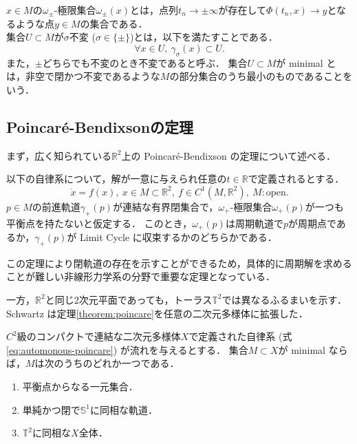\documentclass[../main]{subfiles}
\begin{document}
$x\in M$の$\omega_\pm$-極限集合$\omega_\pm(x)$とは，点列$t_n\to \pm\infty$が存在して$\Phi(t_n,x)\to y$となるような点$y\in M$の集合である．\\

集合$U\subset M$が$\sigma$不変 ($\sigma\in\{\pm\}$)とは，以下を満たすことである．
\begin{equation}
    \forall x\in U,\ \gamma_\sigma (x)\subset U.
\end{equation}
また，$\pm$どちらでも不変のとき不変であると呼ぶ．
集合$U\subset M$が minimal とは，非空で閉かつ不変であるような$M$の部分集合のうち最小のものであることをいう．
\subsection{Poincar\'{e}-Bendixsonの定理}
まず，広く知られている$\mathbb{R}^2$上の Poincar\'{e}-Bendixson の定理について述べる．
\begin{screen}
    \begin{theorem}
        以下の自律系について，解が一意に与えられ任意の$t\in\mathbb{R}$で定義されるとする．
        \begin{equation}
            \dot{x}=f(x),\ x\in M\subset \mathbb{R}^2,\ f\in C^1(M,\mathbb{R}^2),\ M:\mathrm{open}.         \label{eq:automonous-poincare}
        \end{equation}
        $p\in M$の前進軌道$\gamma_+(p)$が連結な有界閉集合で，$\omega_+$-極限集合$\omega_+(p)$が一つも平衡点を持たないと仮定する．
        このとき，$\omega_+(p)$は周期軌道で$p$が周期点であるか，$\gamma_+(p)$が Limit Cycle に収束するかのどちらかである．
        \label{theorem:poincare}
    \end{theorem}
\end{screen}
この定理により閉軌道の存在を示すことができるため，具体的に周期解を求めることが難しい非線形力学系の分野で重要な定理となっている．

一方，$\mathbb{R}^2$と同じ2次元平面であっても，トーラス$\mathbb{T}^2$では異なるふるまいを示す．
Schwartz は定理\ref{theorem:poincare}を任意の二次元多様体に拡張した\cite{Schwartz1963ErrataAG}．
\begin{screen}
    \begin{theorem}
        \label{thm:poiben-gen}
        $C^2$級のコンパクトで連結な二次元多様体$X$で定義された自律系 (式\eqref{eq:automonous-poincare}) が流れを与えるとする．
        集合$M\subset X$が minimal ならば，$M$は次のうちのどれか一つである．
        \begin{enumerate}
            \item 平衡点からなる一元集合．
            \item 単純かつ閉で$\mathbb{S}^1$に同相な軌道．
            \item $\mathbb{T}^2$に同相な$X$全体．
        \end{enumerate}
    \end{theorem}
\end{screen}
\end{document}
